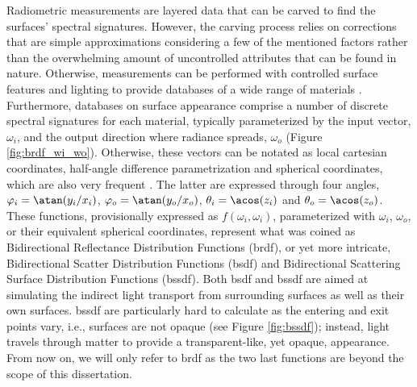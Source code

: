 Radiometric measurements are layered data that can be carved to find the surfaces' spectral signatures. However, the carving process relies on corrections that are simple approximations considering a few of the mentioned factors rather than the overwhelming amount of uncontrolled attributes that can be found in nature. Otherwise, measurements can be performed with controlled surface features and lighting to provide databases of a wide range of materials \cite{dupuy_adaptive_2018}. Furthermore, databases on surface appearance comprise a number of discrete spectral signatures for each material, typically parameterized by the input vector, $\omega_i$, and the output direction where radiance spreads, $\omega_o$ (Figure \ref{fig:brdf_wi_wo}). Otherwise, these vectors can be notated as local cartesian coordinates, half-angle difference parametrization and spherical coordinates, which are also very frequent \cite{montes_soldado_overview_2012}. The latter are expressed through four angles, $\varphi_i = \atan(y_i / x_i)$, $\varphi_o = \atan(y_o / x_o)$, $\theta_i = \acos(z_i)$ and $\theta_o = \acos(z_o)$. These functions, provisionally expressed as $f(\omega_i, \omega_i)$, parameterized with $\omega_i$, $\omega_o$, or their equivalent spherical coordinates, represent what was coined as Bidirectional Reflectance Distribution Functions (\acrshort{brdf}), or yet more intricate, Bidirectional Scatter Distribution Functions (\acrshort{bsdf}) and Bidirectional Scattering Surface Distribution Functions (\acrshort{bssdf}). Both \acrshort{bsdf} and \acrshort{bssdf} are aimed at simulating the indirect light transport from surrounding surfaces as well as their own surfaces. \acrshort{bssdf} are particularly hard to calculate as the entering and exit points vary, i.e., surfaces are not opaque (see Figure \ref{fig:bssdf}); instead, light travels through matter to provide a transparent-like, yet opaque, appearance. From now on, we will only refer to \acrshort{brdf} as the two last functions are beyond the scope of this dissertation.
